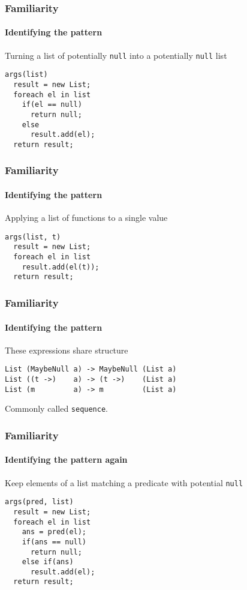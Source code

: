 \begin{frame}[fragile]
\frametitle{Familiarity}
\framesubtitle{Identifying the pattern}
\begin{block}{Turning a list of potentially \lstinline{null} into a potentially \lstinline{null} list}
\begin{lstlisting}[style=language]
args(list)
  result = new List;
  foreach el in list
    if(el == null)
      return null;
    else
      result.add(el);
  return result;
\end{lstlisting}
\end{block}
\end{frame}

\begin{frame}[fragile]
\frametitle{Familiarity}
\framesubtitle{Identifying the pattern}
\begin{block}{Applying a list of functions to a single value}
\begin{lstlisting}[style=language]
args(list, t)
  result = new List;
  foreach el in list
    result.add(el(t));
  return result;
\end{lstlisting}
\end{block}
\end{frame}

\begin{frame}[fragile]
\frametitle{Familiarity}
\framesubtitle{Identifying the pattern}
\begin{block}{These expressions share structure}
\begin{lstlisting}[style=language]
List (MaybeNull a) -> MaybeNull (List a)
List ((t ->)    a) -> (t ->)    (List a)
List (m         a) -> m         (List a)
\end{lstlisting}
\end{block}
Commonly called \lstinline{sequence}.
\end{frame}

\begin{frame}[fragile]
\frametitle{Familiarity}
\framesubtitle{Identifying the pattern again}
\begin{block}{Keep elements of a list matching a predicate with potential \lstinline{null}}
\begin{lstlisting}[style=language]
args(pred, list)
  result = new List;
  foreach el in list
    ans = pred(el);
    if(ans == null)
      return null;
    else if(ans)
      result.add(el);
  return result;
\end{lstlisting}
\end{block}
\end{frame}

